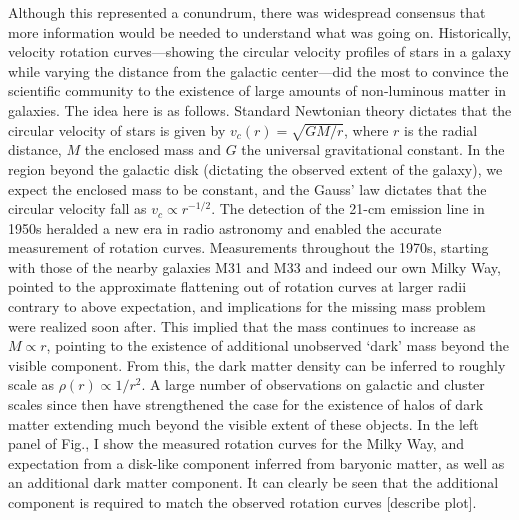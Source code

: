 Although this represented a conundrum, there was widespread consensus that more information would be needed to understand what was going on. Historically, velocity rotation curves---showing the circular velocity profiles of stars in a galaxy while varying the distance from the galactic center---did the most to convince the scientific community to the existence of large amounts of non-luminous matter in galaxies. The idea here is as follows. Standard Newtonian theory dictates that the circular velocity of stars is given by $v_c(r) = \sqrt{GM/r}$, where $r$ is the radial distance, $M$ the enclosed mass and $G$ the universal gravitational constant. In the region beyond the galactic disk (dictating the observed extent of the galaxy), we expect the enclosed mass to be constant, and the Gauss' law dictates that the circular velocity fall as $v_c \propto r^{-1/2}$. The detection of the 21-cm emission line in 1950s heralded a new era in radio astronomy and enabled the accurate measurement of rotation curves. Measurements throughout the 1970s, starting with those of the nearby galaxies M31 and M33 and indeed our own Milky Way, pointed to the approximate flattening out of rotation curves at larger radii contrary to above expectation, and implications for the missing mass problem were realized soon after. This implied that the mass continues to increase as $M \propto r$, pointing to the existence of additional unobserved `dark' mass beyond the visible component. From this, the dark matter density can be inferred to roughly scale as $\rho(r) \propto 1/r^2$. A large number of observations on galactic and cluster scales since then have strengthened the case for the existence of halos of dark matter extending much beyond the visible extent of these objects. In the left panel of Fig., I show the measured rotation curves for the Milky Way, and expectation from a disk-like component inferred from baryonic matter, as well as an additional dark matter component. It can clearly be seen that the additional component is required to match the observed rotation curves [describe plot].

